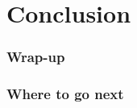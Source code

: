 \section{Conclusion}

\begin{frame}
\frametitle{Wrap-up}
\end{frame}

\begin{frame}
\frametitle{Where to go next}
\end{frame}
